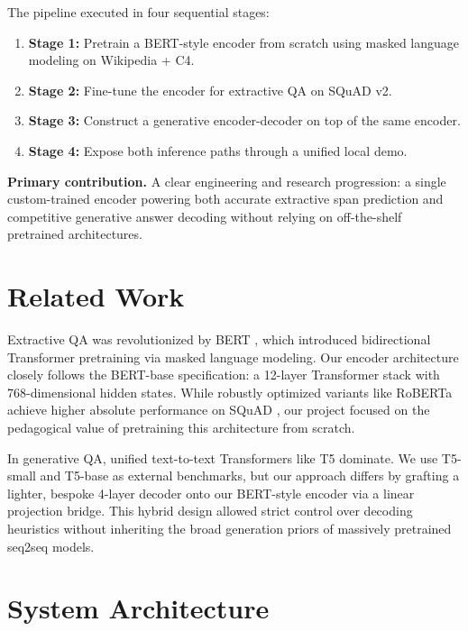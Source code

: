 \documentclass[10pt,twocolumn]{article}
\begin{document}
The pipeline executed in four sequential stages:
\begin{enumerate}[leftmargin=1.2em,itemsep=3pt,topsep=4pt]
    \item \textbf{Stage 1:} Pretrain a BERT-style encoder from scratch using masked language modeling on Wikipedia + C4.
    \item \textbf{Stage 2:} Fine-tune the encoder for extractive QA on SQuAD v2.
    \item \textbf{Stage 3:} Construct a generative encoder-decoder on top of the same encoder.
    \item \textbf{Stage 4:} Expose both inference paths through a unified local demo.
\end{enumerate}

\vfill\columnbreak

\textbf{Primary contribution.} A clear engineering and research progression: a single custom-trained encoder powering both accurate extractive span prediction and competitive generative answer decoding without relying on off-the-shelf pretrained architectures.

\section{Related Work}
Extractive QA was revolutionized by BERT \cite{devlin2019bert}, which introduced bidirectional Transformer pretraining via masked language modeling. Our encoder architecture closely follows the BERT-base specification: a 12-layer Transformer stack with 768-dimensional hidden states. While robustly optimized variants like RoBERTa \cite{liu2019roberta} achieve higher absolute performance on SQuAD \cite{rajpurkar2016squad}, our project focused on the pedagogical value of pretraining this architecture from scratch.

In generative QA, unified text-to-text Transformers like T5 \cite{raffel2020t5} dominate. We use T5-small and T5-base as external benchmarks, but our approach differs by grafting a lighter, bespoke 4-layer decoder onto our BERT-style encoder via a linear projection bridge. This hybrid design allowed strict control over decoding heuristics without inheriting the broad generation priors of massively pretrained seq2seq models.

\section{System Architecture}
\end{document}
